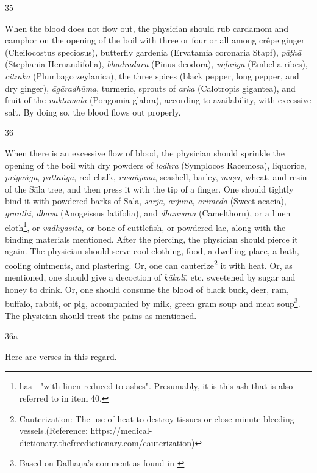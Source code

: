 \begin{translation}
\item[35]

When the blood does not flow out, the physician should rub cardamom and camphor on the opening of the boil with three or four or all among crêpe ginger (Cheilocostus speciosus), butterfly gardenia (Ervatamia coronaria Stapf), \emph{pāṭhā} (Stephania Hernandifolia), \emph{bhadradāru} (Pinus deodora), \emph{viḍaṅga} (Embelia ribes), \emph{citraka} (Plumbago zeylanica), the three spices (black pepper, long pepper, and dry ginger), \emph{āgāradhūma}, turmeric, sprouts of \emph{arka} (Calotropis gigantea), and fruit of the \emph{naktamāla} (Pongomia glabra), according to availability, with excessive salt. By doing so, the blood flows out properly.

\item[36]

When there is an excessive flow of blood, the physician should sprinkle the opening of the boil with dry powders of \emph{lodhra} (Symplocos Racemosa), liquorice, \emph{priyaṅgu}, \emph{pattāṅga}, red chalk, \emph{rasāñjana}, seashell, barley, \emph{māṣa}, wheat, and resin of the Sāla tree, and then press it with the tip of a finger. 
One should tightly bind it with powdered barks of Sāla, \emph{sarja}, 
\emph{arjuna}, \emph{arimeda} (Sweet acacia), \emph{granthi}, \emph{dhava} 
(Anogeissus latifolia), and \emph{dhanvana} (Camelthorn), or a linen 
cloth\footnote{\cite[66]{vulgate} has  - "with linen 
reduced to ashes". Presumably, it is this ash that is also referred to in item 40.}, or 
\emph{vadhyāsita}, or bone of cuttlefish, or powdered lac, along with the binding 
materials mentioned. 
After the piercing, the physician should pierce it again. 
The physician should serve cool clothing, food, a dwelling place, a bath, cooling 
ointments, and plastering. Or, one can cauterize\footnote{Cauterization: The use of 
heat to destroy tissues or close minute bleeding vessels.(Reference: 
https://medical-dictionary.thefreedictionary.com/cauterization)} it with heat. Or, as 
mentioned, one should give a decoction of \emph{kākolī}, etc. sweetened by sugar 
and honey to drink. 
Or, one should consume the blood of black buck, deer, ram, buffalo, rabbit, or pig, accompanied by milk, green gram soup and meat soup\footnote{Based on Ḍalhaṇa's comment as found in \cite[66]{vulgate}}. 
The physician should treat the pains as mentioned. 

\item[36a]

Here are verses in this regard.


\end{translation}
